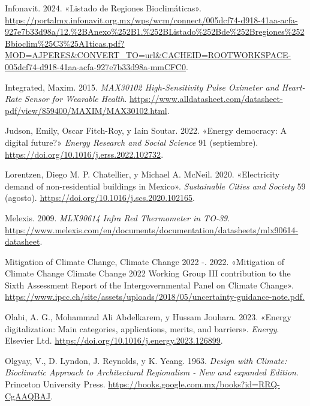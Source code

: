 \documentclass[
  letterpaper,
  DIV=11,
  numbers=noendperiod]{scrreport}
\newlength{\cslhangindent}
\newlength{\cslentryspacingunit} %
\newenvironment{CSLReferences}[2] %
 {%
  \setlength{\parindent}{0pt}
  \ifodd #1
  \let\oldpar\par
  \def\par{\hangindent=\cslhangindent\oldpar}
  \fi
  \setlength{\parskip}{#2\cslentryspacingunit}
 }%
 {}
\begin{document}
\begin{CSLReferences}{1}{0}
\leavevmode{}%
Infonavit. 2024. {«Listado de Regiones Bioclimáticas»}.
\url{https://portalmx.infonavit.org.mx/wps/wcm/connect/005dcf74-d918-41aa-acfa-927e7b33d98a/12.\%2BAnexo\%252B1.\%252BListado\%252Bde\%252Bregiones\%252Bbioclim\%25C3\%25A1ticas.pdf?MOD=AJPERES\&CONVERT_TO=url\&CACHEID=ROOTWORKSPACE-005dcf74-d918-41aa-acfa-927e7b33d98a-mmCFC0}.

\leavevmode{}%
Integrated, Maxim. 2015. \emph{MAX30102 High-Sensitivity Pulse Oximeter
and Heart-Rate Sensor for Wearable Health}.
\url{https://www.alldatasheet.com/datasheet-pdf/view/859400/MAXIM/MAX30102.html}.

\leavevmode{}%
Judson, Emily, Oscar Fitch-Roy, y Iain Soutar. 2022. {«Energy democracy:
A digital future?»} \emph{Energy Research and Social Science} 91
(septiembre). \url{https://doi.org/10.1016/j.erss.2022.102732}.

\leavevmode{}%
Lorentzen, Diego M. P. Chatellier, y Michael A. McNeil. 2020.
{«Electricity demand of non-residential buildings in Mexico»}.
\emph{Sustainable Cities and Society} 59 (agosto).
\url{https://doi.org/10.1016/j.scs.2020.102165}.

\leavevmode{}%
Melexis. 2009. \emph{MLX90614 Infra Red Thermometer in TO-39}.
\url{https://www.melexis.com/en/documents/documentation/datasheets/mlx90614-datasheet}.

\leavevmode{}%
Mitigation of Climate Change, Climate Change 2022 -. 2022. {«Mitigation
of Climate Change Climate Change 2022 Working Group III contribution to
the Sixth Assessment Report of the Intergovernmental Panel on Climate
Change»}.
\url{https://www.ipcc.ch/site/assets/uploads/2018/05/uncertainty-guidance-note.pdf.}

\leavevmode{}%
Olabi, A. G., Mohammad Ali Abdelkarem, y Hussam Jouhara. 2023. {«Energy
digitalization: Main categories, applications, merits, and barriers»}.
\emph{Energy}. Elsevier Ltd.
\url{https://doi.org/10.1016/j.energy.2023.126899}.

\leavevmode{}%
Olgyay, V., D. Lyndon, J. Reynolds, y K. Yeang. 1963. \emph{Design with
Climate: Bioclimatic Approach to Architectural Regionalism - New and
expanded Edition}. Princeton University Press.
\url{https://books.google.com.mx/books?id=RRQ-CgAAQBAJ}.


\end{CSLReferences}
\end{document}
